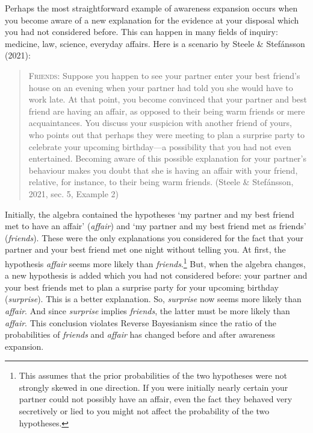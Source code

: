 \documentclass[
  11pt,
  dvipsnames,enabledeprecatedfontcommands]{scrartcl}
\begin{document}
Perhaps the most straightforward example of awareness expansion occurs
when you become aware of a new explanation for the evidence at your
disposal which you had not considered before. This can happen in many
fields of inquiry: medicine, law, science, everyday affairs. Here is a
scenario by Steele \& Stefánsson (2021):

\begin{quote}
\textsc{Friends}: Suppose you happen to see your partner enter your best
friend's house on an evening when your partner had told you she would
have to work late. At that point, you become convinced that your partner
and best friend are having an affair, as opposed to their being warm
friends or mere acquaintances. You discuss your suspicion with another
friend of yours, who points out that perhaps they were meeting to plan a
surprise party to celebrate your upcoming birthday---a possibility that
you had not even entertained. Becoming aware of this possible
explanation for your partner's behaviour makes you doubt that she is
having an affair with your friend, relative, for instance, to their
being warm friends. (Steele \& Stefánsson, 2021, sec. 5, Example 2)
\end{quote}

\doublespace

\noindent Initially, the algebra contained the hypotheses `my partner
and my best friend met to have an affair' (\textit{affair}) and `my
partner and my best friend met as friends' (\textit{friends}). These
were the only explanations you considered for the fact that your partner
and your best friend met one night without telling you. At first, the
hypothesis \textit{affair} seems more likely than
\textit{friends}.\footnote{This assumes that the prior probabilities of
  the two hypotheses were not strongly skewed in one direction. If you
  were initially nearly certain your partner could not possibly have an
  affair, even the fact they behaved very secretively or lied to you
  might not affect the probability of the two hypotheses.} But, when the
algebra changes, a new hypothesis is added which you had not considered
before: your partner and your best friends met to plan a surprise party
for your upcoming birthday (\textit{surprise}). This is a better
explanation. So, \textit{surprise} now seems more likely than
\textit{affair}. And since \textit{surprise} implies \textit{friends},
the latter must be more likely than \textit{affair}. This conclusion
violates Reverse Bayesianism since the ratio of the probabilities of
\textit{friends} and \textit{affair} has changed before and after
awareness expansion.
\end{document}
